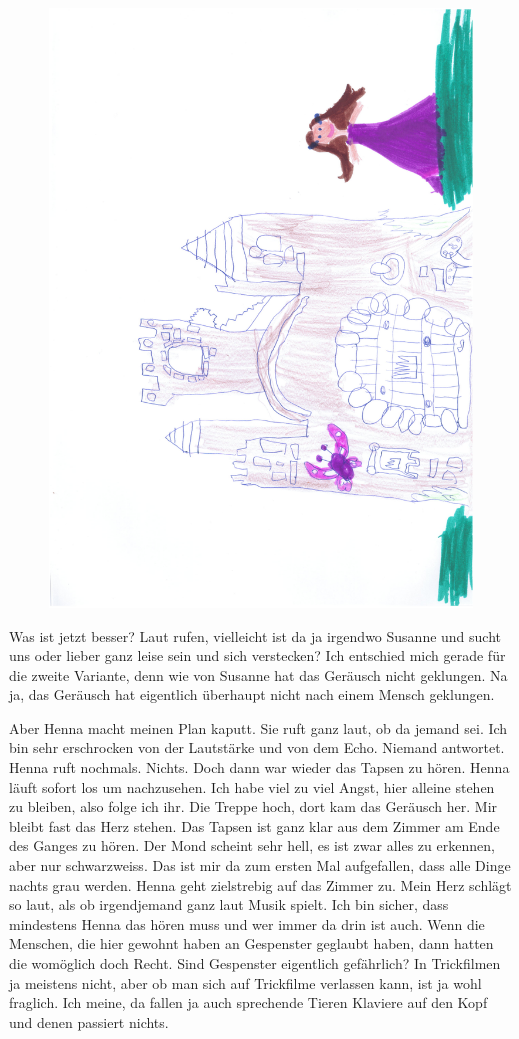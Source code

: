 \begin{figure}[hb]
\centering
\includegraphics[angle=270,width=.8\textwidth]{bilder/prinzessin.pdf}
\end{figure}

Was ist jetzt besser? Laut rufen, vielleicht ist da ja irgendwo Susanne und sucht uns oder lieber ganz leise sein und sich verstecken? Ich entschied mich gerade für die zweite Variante, denn wie von Susanne hat das Geräusch nicht geklungen. Na ja, das Geräusch hat eigentlich überhaupt nicht nach einem Mensch geklungen.

Aber Henna macht meinen Plan kaputt. Sie ruft ganz laut, ob da jemand sei. Ich bin sehr erschrocken von der Lautstärke und von dem Echo. Niemand antwortet. Henna ruft nochmals. Nichts. Doch dann war wieder das Tapsen zu hören. Henna läuft sofort los um nachzusehen. Ich habe viel zu viel Angst, hier alleine stehen zu bleiben, also folge ich ihr. Die Treppe hoch, dort kam das Geräusch her. Mir bleibt fast das Herz stehen. Das Tapsen ist ganz klar aus dem Zimmer am Ende des Ganges zu hören. Der Mond scheint sehr hell, es ist zwar alles zu erkennen, aber nur schwarzweiss. Das ist mir da zum ersten Mal aufgefallen, dass alle Dinge nachts grau werden. Henna geht zielstrebig auf das Zimmer zu. Mein Herz schlägt so laut, als ob irgendjemand ganz laut Musik spielt. Ich bin sicher, dass mindestens Henna das hören muss und wer immer da drin ist auch. Wenn die Menschen, die hier gewohnt haben an Gespenster geglaubt haben, dann hatten die womöglich doch Recht. Sind Gespenster eigentlich gefährlich? In Trickfilmen ja meistens nicht, aber ob man sich auf Trickfilme verlassen kann, ist ja wohl fraglich. Ich meine, da fallen ja auch sprechende Tieren Klaviere auf den Kopf und denen passiert nichts. 


